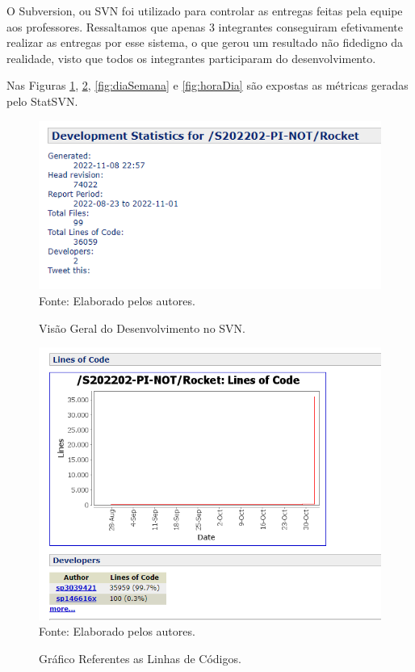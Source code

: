 \documentclass[
    12pt,               %
    openright,          %
    oneside,
    a4paper,            %
    BIBLATEX,           %
    TODO,               %
    english,            %
    brazil              %
    ]{ifsp-spo-inf-ctds}
\begin{document}
        O Subversion, ou SVN foi utilizado para controlar as entregas feitas pela equipe aos professores. Ressaltamos que apenas 3 integrantes conseguiram efetivamente realizar as entregas por esse sistema, o que gerou um resultado não fidedigno da realidade, visto que todos os integrantes participaram do desenvolvimento. 

        Nas Figuras \ref{fig:desenvolvimentoSVN}, \ref{fig:linhaCod}, \ref{fig:diaSemana} e \ref{fig:horaDia} são expostas as métricas geradas pelo StatSVN.

    \begin{figure}[H]
                \centering
                \caption{Visão Geral do Desenvolvimento no SVN.}
                \includegraphics[width=1 \textwidth]{StatSVN/StatDesenvolvimento.png}
                {\footnotesize Fonte: Elaborado pelos autores.}
                \label{fig:desenvolvimentoSVN}
            \end{figure}

    \begin{figure}[H]
                \centering
                \caption{Gráfico Referentes as Linhas de Códigos.}
                \includegraphics[width=1 \textwidth]{StatSVN/linha de codigo autor.png}
                {\footnotesize Fonte: Elaborado pelos autores.}
                \label{fig:linhaCod}
            \end{figure}
\end{document}
